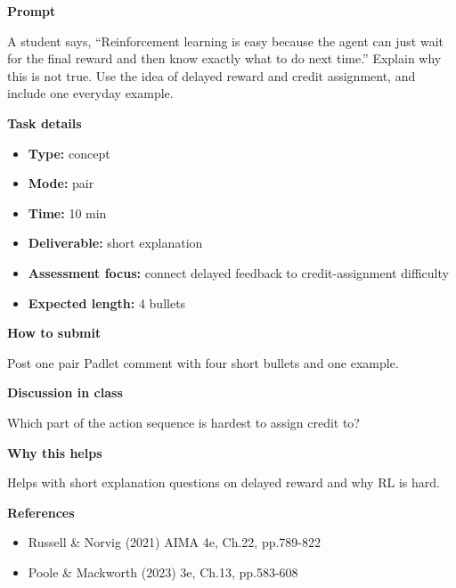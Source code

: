 \documentclass[11pt]{article}
\begin{document}
\begin{tcolorbox}[colback=white,colframe=MidnightBlue,title={Q1 RL Intuition and Credit Assignment},fonttitle=\bfseries,breakable]
\begin{center}
\end{center}

{\large\bfseries\color{MidnightBlue} Prompt}\par\medskip
A student says, ``Reinforcement learning is easy because the agent can just wait for the final reward and then know exactly what to do next time.'' Explain why this is not true. Use the idea of delayed reward and credit assignment, and include one everyday example.

{\large\bfseries\color{MidnightBlue} Task details}\par\medskip
\begin{itemize}\item \textbf{Type:} concept
\item \textbf{Mode:} pair
\item \textbf{Time:} 10 min
\item \textbf{Deliverable:} short explanation
\item \textbf{Assessment focus:} connect delayed feedback to credit-assignment difficulty
\item \textbf{Expected length:} 4 bullets\end{itemize}

{\large\bfseries\color{MidnightBlue} How to submit}\par\medskip
Post one pair Padlet comment with four short bullets and one example.

{\large\bfseries\color{MidnightBlue} Discussion in class}\par\medskip
Which part of the action sequence is hardest to assign credit to?

{\large\bfseries\color{MidnightBlue} Why this helps}\par\medskip
Helps with short explanation questions on delayed reward and why RL is hard.

{\large\bfseries\color{MidnightBlue} References}\par\medskip
\begin{itemize}\item Russell \& Norvig (2021) AIMA 4e, Ch.22, pp.789-822
\item Poole \& Mackworth (2023) 3e, Ch.13, pp.583-608\end{itemize}
\end{tcolorbox}
\end{document}
